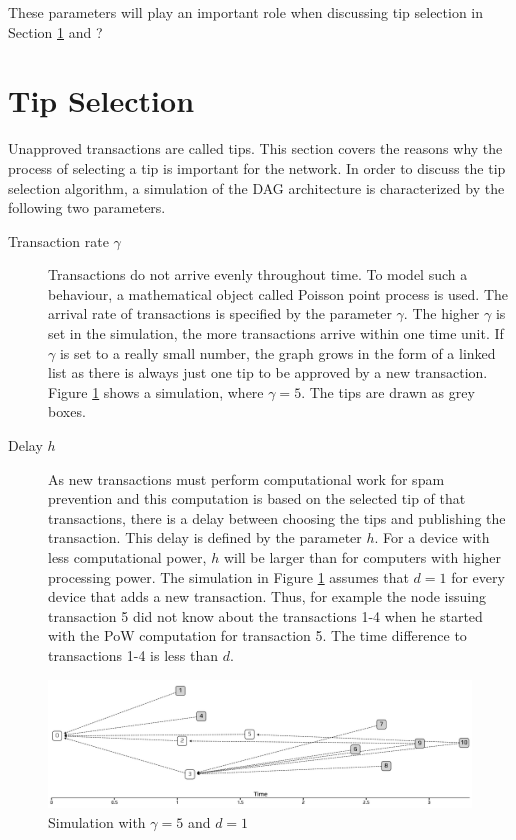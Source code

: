 These parameters will play an important role when discussing tip selection in Section \ref{tip-selection} and ?

\section{Tip Selection}\label{tip-selection}
Unapproved transactions are called tips. This section covers the reasons why the process of selecting a tip is important for the network.
In order to discuss the tip selection algorithm, a simulation of the DAG architecture is characterized by the following two parameters. 


\begin{description}
    \item[Transaction rate $\gamma$] Transactions do not arrive evenly throughout time. To model such a behaviour, a mathematical object called Poisson point process is used. The arrival rate of transactions is specified by the parameter $\gamma$. The higher $\gamma$ is set in the simulation, the more transactions arrive within one time unit. If $\gamma$ is set to a really small number, the graph grows in the form of a linked list as there is always just one tip to be approved by a new transaction. Figure \ref{fig:simulation} shows a simulation, where $\gamma=5$. The tips are drawn as grey boxes.
    \item[Delay $h$] As new transactions must perform computational work for spam prevention and this computation is based on the selected tip of that transactions, there is a delay between choosing the tips and publishing the transaction. This delay is defined by the parameter $h$. For a device with less computational power, $h$ will be larger than for computers with higher processing power. The simulation in Figure \ref{fig:simulation} assumes that $d=1$ for every device that adds a new transaction. Thus, for example the node issuing transaction 5 did not know about the transactions 1-4 when he started with the PoW computation for transaction 5. The time difference to transactions 1-4 is less than $d$. 
\end{description}

\begin{figure}[H]
    \centering
    \includegraphics[width=1.0\textwidth]{images/simulation.png}
    \caption{Simulation with $\gamma=5$ and $d=1$  \cite{the-tangle-part-1}}
    \label{fig:simulation}
\end{figure}


